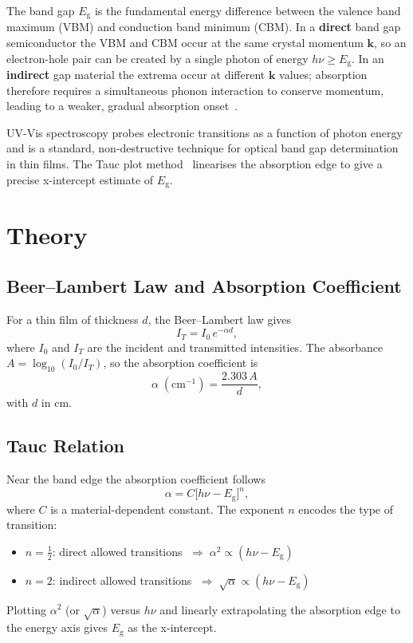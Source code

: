 \documentclass[12pt,a4paper]{article}
\newcommand{\Eg}{E_{\mathrm{g}}}
\newcommand{\hnu}{h\nu}
\begin{document}
The band gap $\Eg$ is the fundamental energy difference between the valence band
maximum (VBM) and conduction band minimum (CBM).  In a \textbf{direct} band gap
semiconductor the VBM and CBM occur at the same crystal momentum $\mathbf{k}$, so an
electron-hole pair can be created by a single photon of energy $\hnu \geq \Eg$.  In an
\textbf{indirect} gap material the extrema occur at different $\mathbf{k}$ values; absorption
therefore requires a simultaneous phonon interaction to conserve momentum, leading to a
weaker, gradual absorption onset~\cite{Pankove1971}.

UV-Vis spectroscopy probes electronic transitions as a function of photon energy and is a
standard, non-destructive technique for optical band gap determination in thin films.  The
Tauc plot method~\cite{Tauc1966} linearises the absorption edge to give a precise
x-intercept estimate of $\Eg$.

\section{Theory}

\subsection{Beer–Lambert Law and Absorption Coefficient}

For a thin film of thickness $d$, the Beer–Lambert law gives
\begin{equation}
  I_T = I_0 \, e^{-\alpha d},
  \label{eq:BeerLambert}
\end{equation}
where $I_0$ and $I_T$ are the incident and transmitted intensities.
The absorbance $A = \log_{10}(I_0/I_T)$, so the absorption coefficient is
\begin{equation}
  \alpha \;(\mathrm{cm}^{-1}) = \frac{2.303\,A}{d},
  \label{eq:alpha}
\end{equation}
with $d$ in cm.

\subsection{Tauc Relation}

Near the band edge the absorption coefficient follows~\cite{Tauc1966,Pankove1971}
\begin{equation}
  \alpha = C \bigl[\hnu - \Eg\bigr]^{n},
  \label{eq:Tauc}
\end{equation}
where $C$ is a material-dependent constant.  The exponent $n$ encodes the type of
transition:
\begin{itemize}
  \item $n = \tfrac{1}{2}$: direct allowed transitions $\;\Rightarrow\; \alpha^2 \propto (\hnu-\Eg)$
  \item $n = 2$: indirect allowed transitions $\;\Rightarrow\; \sqrt{\alpha} \propto (\hnu-\Eg)$
\end{itemize}
Plotting $\alpha^2$ (or $\sqrt{\alpha}$) versus $\hnu$ and linearly extrapolating the
absorption edge to the energy axis gives $\Eg$ as the x-intercept.
\end{document}
